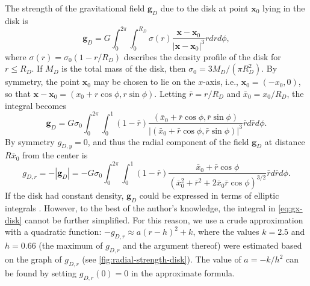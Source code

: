 The strength of the gravitational field $\mathbf{g}_D$ due to the disk at point $\mathbf{x}_0$ lying in the disk is
\begin{equation*}
    \mathbf{g}_D = G \int_{0}^{2\pi}\int_{0}^{R_D} \sigma(r) \frac{\mathbf{x} - \mathbf{x}_0}{|\mathbf{x} - \mathbf{x}_0|^3}r dr d\phi,
\end{equation*}
where $\sigma(r) = \sigma_0(1 - r/R_D)$ describes the density profile of the disk for $r \leq R_D$.
If $M_D$ is the total mass of the disk, then $\sigma_0 = 3M_D / (\pi R_D^2)$.
By symmetry, the point $\mathbf{x}_0$ may be chosen to lie on the $x$-axis, i.e., $\mathbf{x}_0 = (-x_0, 0)$, so that $\mathbf{x} - \mathbf{x}_0 = (x_0 + r\cos\phi, r\sin\phi)$.
Letting $\bar{r} = r/R_D$ and $\bar{x}_0 = x_0 / R_D$, the integral becomes
\begin{equation*}
    \mathbf{g}_D = G\sigma_0 \int_{0}^{2\pi} \int_{0}^{1} (1 - \bar{r}) \frac{(\bar{x}_0 + \bar{r}\cos\phi, \bar{r}\sin\phi)}{|(\bar{x}_0 + \bar{r}\cos\phi, \bar{r}\sin\phi)|^3}\bar{r} d\bar{r} d\phi.
\end{equation*}
By symmetry $g_{D,y} = 0$, and thus the radial component of the field $\mathbf{g}_D$ at distance $R\bar{x}_0$ from the center is
\begin{equation}\label{eq:gx-disk}
    g_{D,r} = -|\mathbf{g}_D| = -G\sigma_0 \int_{0}^{2\pi} \int_{0}^{1} (1 - \bar{r})\frac{\bar{x}_0 + \bar{r}\cos\phi}{(\bar{x}_0^2+\bar{r}^2+2\bar{x}_0\bar{r}\cos\phi)^{3/2}}\bar{r}d\bar{r}d\phi.
\end{equation}
If the disk had constant density, $\mathbf{g}_D$ could be expressed in terms of elliptic integrals \cite{Weiss2018}.
However, to the best of the author's knowledge, the integral in \autoref{eq:gx-disk} cannot be further simplified.
For this reason, we use a crude approximation with a quadratic function: $-g_{D,r} \approx a(r - h)^2 + k$, where the values $k=2.5$ and $h=0.66$ (the maximum of $g_{D,r}$ and the argument thereof) were estimated based on the graph of $g_{D,r}$ (see \autoref{fig:radial-strength-disk}).
The value of $a = -k/h^2$ can be found by setting $g_{D,r}(0) = 0$ in the approximate formula.
